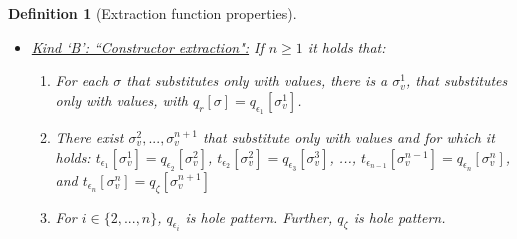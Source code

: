 \documentclass[11pt]{article} %
\newtheorem{definition}{Definition}
\begin{document}
\begin{definition}[Extraction function properties]
\begin{itemize}
\item \underline{Kind `B': ``Constructor extraction":} If $n \geq 1$ it holds that:
\begin{enumerate}
\item For each $\sigma$ that substitutes only with values, there is a $\sigma^1_v$, that substitutes only with values, with $q_r[\sigma] = q_{\epsilon_1}[\sigma^1_v]$.
\item There exist $\sigma^2_v, ..., \sigma^{n+1}_v$ that substitute only with values and for which it holds: $t_{\epsilon_1}[\sigma^1_v] = q_{\epsilon_2}[\sigma^2_v]$, $t_{\epsilon_2}[\sigma^2_v] = q_{\epsilon_3}[\sigma^3_v]$, ..., $t_{\epsilon_{n-1}}[\sigma^{n-1}_v] = q_{\epsilon_n}[\sigma^n_v]$, and $t_{\epsilon_n}[\sigma^n_v] = q_\zeta[\sigma^{n+1}_v]$
\item For $i \in \{2, ..., n\}$, $q_{\epsilon_i}$ is hole pattern. Further, $q_\zeta$ is hole pattern.
\end{enumerate}
\end{itemize}

\end{definition}
\end{document}
